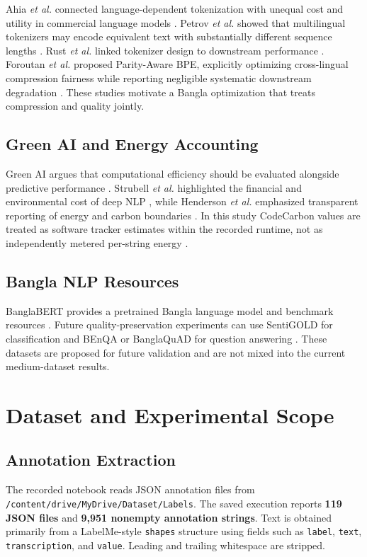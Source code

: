 \documentclass[conference]{IEEEtran}
\begin{document}
Ahia \textit{et al.} connected language-dependent tokenization with unequal cost and utility in commercial language models \cite{ahia2023}. Petrov \textit{et al.} showed that multilingual tokenizers may encode equivalent text with substantially different sequence lengths \cite{petrov2023}. Rust \textit{et al.} linked tokenizer design to downstream performance \cite{rust2021}. Foroutan \textit{et al.} proposed Parity-Aware BPE, explicitly optimizing cross-lingual compression fairness while reporting negligible systematic downstream degradation \cite{foroutan2026}. These studies motivate a Bangla optimization that treats compression and quality jointly.

\subsection{Green AI and Energy Accounting}
Green AI argues that computational efficiency should be evaluated alongside predictive performance \cite{schwartz2020}. Strubell \textit{et al.} highlighted the financial and environmental cost of deep NLP \cite{strubell2019}, while Henderson \textit{et al.} emphasized transparent reporting of energy and carbon boundaries \cite{henderson2020}. In this study CodeCarbon values are treated as software tracker estimates within the recorded runtime, not as independently metered per-string energy \cite{codecarbon}.

\subsection{Bangla NLP Resources}
BanglaBERT provides a pretrained Bangla language model and benchmark resources \cite{bhattacharjee2022}. Future quality-preservation experiments can use SentiGOLD for classification \cite{islam2023} and BEnQA or BanglaQuAD for question answering \cite{shafayat2024,rony2024}. These datasets are proposed for future validation and are not mixed into the current medium-dataset results.

\section{Dataset and Experimental Scope}
\subsection{Annotation Extraction}
The recorded notebook reads JSON annotation files from \texttt{/content/drive/MyDrive/Dataset/Labels}. The saved execution reports \textbf{119 JSON files} and \textbf{9,951 nonempty annotation strings}. Text is obtained primarily from a LabelMe-style \texttt{shapes} structure using fields such as \texttt{label}, \texttt{text}, \texttt{transcription}, and \texttt{value}. Leading and trailing whitespace are stripped.
\end{document}
